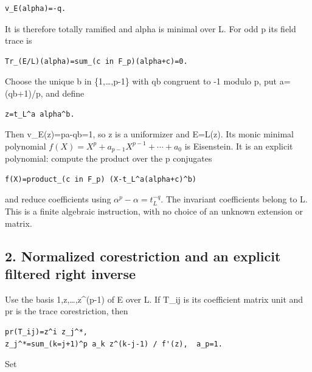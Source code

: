 \begin{Verbatim}[fontsize=\small,breaklines=true,breakanywhere=true]
v_E(alpha)=-q.
\end{Verbatim}

It is therefore totally ramified and alpha is minimal over L. For odd p
its field trace is

\begin{Verbatim}[fontsize=\small,breaklines=true,breakanywhere=true]
Tr_(E/L)(alpha)=sum_(c in F_p)(alpha+c)=0.
\end{Verbatim}

Choose the unique b in \{1,\ldots,p-1\} with qb congruent to -1 modulo
p, put a=(qb+1)/p, and define

\begin{Verbatim}[fontsize=\small,breaklines=true,breakanywhere=true]
z=t_L^a alpha^b.
\end{Verbatim}

Then v\_E(z)=pa-qb=1, so z is a uniformizer and E=L(z). Its monic
minimal polynomial \(f(X)=X^p+a_{p-1}X^{p-1}+\cdots+a_0\)
is Eisenstein. It is an explicit polynomial: compute the product over
the p conjugates

\begin{Verbatim}[fontsize=\small,breaklines=true,breakanywhere=true]
f(X)=product_(c in F_p) (X-t_L^a(alpha+c)^b)
\end{Verbatim}

and reduce coefficients using \(\alpha^p-\alpha=t_L^{-q}\).
The invariant coefficients belong to L. This is a finite algebraic
instruction, with no choice of an unknown extension or matrix.

\hypertarget{odd_tower-normalized-corestriction-and-an-explicit-filtered-right-inverse}{%
\subsection{2. Normalized corestriction and an explicit filtered right
inverse}\label{odd_tower-normalized-corestriction-and-an-explicit-filtered-right-inverse}}

Use the basis 1,z,\ldots,z\^{}(p-1) of E over L. If T\_ij is its
coefficient matrix unit and pr is the trace corestriction, then

\begin{Verbatim}[fontsize=\small,breaklines=true,breakanywhere=true]
pr(T_ij)=z^i z_j^*,
z_j^*=sum_(k=j+1)^p a_k z^(k-j-1) / f'(z),  a_p=1.
\end{Verbatim}

Set

